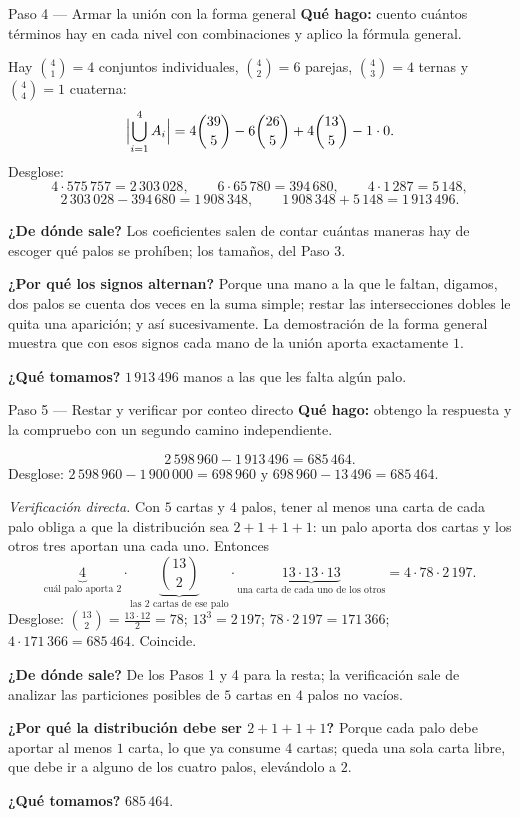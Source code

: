 \documentclass[11pt]{article}
\begin{document}
\begin{paso}{Paso 4 --- Armar la unión con la forma general}
\textbf{Qué hago:} cuento cuántos términos hay en cada nivel con combinaciones y aplico la fórmula general.

Hay $\binom{4}{1}=4$ conjuntos individuales, $\binom{4}{2}=6$ parejas, $\binom{4}{3}=4$ ternas y $\binom{4}{4}=1$ cuaterna:
\[
\Bigl|\bigcup_{i=1}^{4}A_i\Bigr| = 4\binom{39}{5} - 6\binom{26}{5} + 4\binom{13}{5} - 1\cdot 0 .
\]
Desglose:
\[
4\cdot 575\,757 = 2\,303\,028,\qquad 6\cdot 65\,780 = 394\,680,\qquad 4\cdot 1\,287 = 5\,148 ,
\]
\[
2\,303\,028 - 394\,680 = 1\,908\,348,\qquad 1\,908\,348 + 5\,148 = 1\,913\,496 .
\]

\textbf{¿De dónde sale?} Los coeficientes salen de contar cuántas maneras hay de escoger qué palos se prohíben; los tamaños, del Paso 3.

\textbf{¿Por qué los signos alternan?} Porque una mano a la que le faltan, digamos, dos palos se cuenta dos veces en la suma simple; restar las intersecciones dobles le quita una aparición; y así sucesivamente. La demostración de la forma general muestra que con esos signos cada mano de la unión aporta exactamente $1$.

\textbf{¿Qué tomamos?} $1\,913\,496$ manos a las que les falta algún palo.
\end{paso}

\begin{paso}{Paso 5 --- Restar y verificar por conteo directo}
\textbf{Qué hago:} obtengo la respuesta y la compruebo con un segundo camino independiente.

\[
2\,598\,960 - 1\,913\,496 = 685\,464 .
\]
Desglose: $2\,598\,960 - 1\,900\,000 = 698\,960$ y $698\,960 - 13\,496 = 685\,464$.

\emph{Verificación directa.} Con $5$ cartas y $4$ palos, tener al menos una carta de cada palo obliga a que la distribución sea $2+1+1+1$: un palo aporta dos cartas y los otros tres aportan una cada uno. Entonces
\[
\underbrace{4}_{\text{cuál palo aporta 2}}\cdot \underbrace{\binom{13}{2}}_{\text{las 2 cartas de ese palo}}\cdot \underbrace{13\cdot 13\cdot 13}_{\text{una carta de cada uno de los otros}} = 4\cdot 78\cdot 2\,197 .
\]
Desglose: $\binom{13}{2}=\frac{13\cdot 12}{2}=78$; $13^3 = 2\,197$; $78\cdot 2\,197 = 171\,366$; $4\cdot 171\,366 = 685\,464$. Coincide.

\textbf{¿De dónde sale?} De los Pasos 1 y 4 para la resta; la verificación sale de analizar las particiones posibles de $5$ cartas en $4$ palos no vacíos.

\textbf{¿Por qué la distribución debe ser $2+1+1+1$?} Porque cada palo debe aportar al menos $1$ carta, lo que ya consume $4$ cartas; queda una sola carta libre, que debe ir a alguno de los cuatro palos, elevándolo a $2$.

\textbf{¿Qué tomamos?} $685\,464$.
\end{paso}
\end{document}
